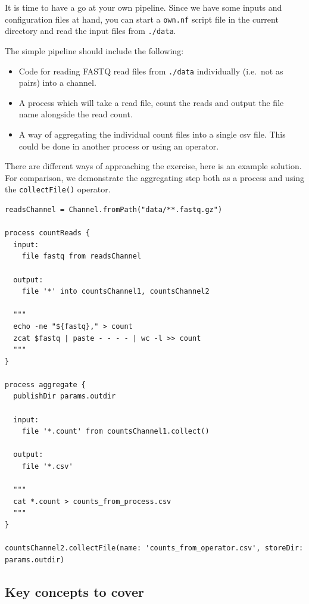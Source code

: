 It is time to have a go at your own pipeline. 
Since we have some inputs and configuration files at hand, 
you can start a \texttt{own.nf} script file in the current 
directory and read the input files from \texttt{./data}. 

\begin{questions}
The simple pipeline should include the following:

\begin{itemize}
\item Code for reading FASTQ read files from \texttt{./data} individually (i.e.\ not as pairs) into a channel.
\item A process which will take a read file, count the reads and output the file name alongside the read count.
\item A way of aggregating the individual count files into a single csv file. This could be done in another process or using an operator. 
\end{itemize}

\begin{answer}

There are different ways of approaching the exercise, 
here is an example solution.
For comparison, we demonstrate the aggregating step both as a process
and using the \texttt{collectFile()} operator. 

\begin{lstlisting}
readsChannel = Channel.fromPath("data/**.fastq.gz") 

process countReads {
  input:
    file fastq from readsChannel

  output:
    file '*' into countsChannel1, countsChannel2

  """
  echo -ne "${fastq}," > count
  zcat $fastq | paste - - - - | wc -l >> count
  """
}

process aggregate {
  publishDir params.outdir

  input:
    file '*.count' from countsChannel1.collect()

  output:
    file '*.csv'

  """
  cat *.count > counts_from_process.csv
  """
}

countsChannel2.collectFile(name: 'counts_from_operator.csv', storeDir: params.outdir)
\end{lstlisting}
\end{answer}

\end{questions}
\subsection{Key concepts to cover}



